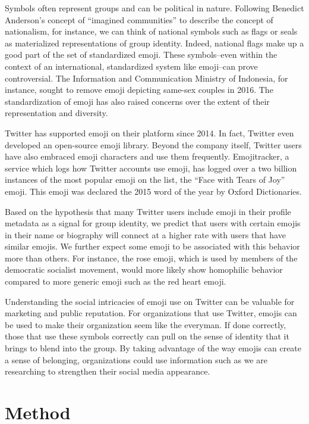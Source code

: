 \documentclass[manuscript, authordraft]{acmart}
\begin{document}
Symbols often represent groups and can be political in
nature. Following Benedict Anderson’s concept of ``imagined
communities'' to describe the concept of
nationalism\cite{anderson2006imagined}, for instance, we can think of
national symbols such as flags or seals as materialized
representations of group identity. Indeed, national flags make up a
good part of the set of standardized emoji\cite{unicodeemoji}. These
symbols–even within the context of an international, standardized
system like emoji–can prove controversial. The Information and
Communication Ministry of Indonesia, for instance, sought to remove
emoji depicting same-sex couples in
2016\cite{boellstorff2016against}. The standardization of emoji has
also raised concerns over the extent of their representation and
diversity.

Twitter has supported emoji on their platform since 2014. In fact,
Twitter even developed an open-source emoji library. Beyond the
company itself, Twitter users have also embraced emoji characters and
use them frequently. Emojitracker, a service which logs how Twitter
accounts use emoji, has logged over a two billion instances of the
most popular emoji on the list, the “Face with Tears of Joy”
emoji\cite{emojitracker}. This emoji was declared the 2015 word of the
year by Oxford Dictionaries.

Based on the hypothesis that many Twitter users include emoji in their
profile metadata as a signal for group identity, we predict that users
with certain emojis in their name or biography will connect at a
higher rate with users that have similar emojis. We further expect
some emoji to be associated with this behavior more than others. For
instance, the rose emoji, which is used by members of the democratic
socialist movement, would more likely show homophilic behavior
compared to more generic emoji such as the red heart emoji.

Understanding the social intricacies of emoji use on Twitter can be
valuable for marketing and public reputation. For organizations that
use Twitter, emojis can be used to make their organization seem like
the everyman. If done correctly, those that use these symbols
correctly can pull on the sense of identity that it brings to blend
into the group. By taking advantage of the way emojis can create a
sense of belonging, organizations could use information such as we are
researching to strengthen their social media appearance.


\section{Method}
\end{document}
